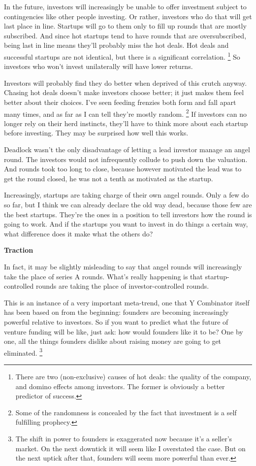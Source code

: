 \documentclass[12pt]{book}
\begin{document}
In the future, investors will increasingly be unable to offer investment
subject to contingencies like other people investing. Or rather,
investors who do that will get last place in line. Startups will go to
them only to fill up rounds that are mostly subscribed. And since hot
startups tend to have rounds that are oversubscribed, being last in line
means they'll probably miss the hot deals. Hot deals and successful
startups are not identical, but there is a significant correlation.
\footnote{There are two (non-exclusive) causes of hot deals: the quality
of the company, and domino effects among investors. The former is
obviously a better predictor of success.} So investors who won't invest unilaterally will
have lower returns.

Investors will probably find they do better when deprived of this crutch
anyway. Chasing hot deals doesn't make investors choose better; it just
makes them feel better about their choices. I've seen feeding frenzies
both form and fall apart many times, and as far as I can tell they're
mostly random. \footnote{Some of the randomness is concealed by the fact that investment
is a self fulfilling prophecy.} If investors can no longer rely
on their herd instincts, they'll have to think more about each startup
before investing. They may be surprised how well this works.

Deadlock wasn't the only disadvantage of letting a lead investor manage
an angel round. The investors would not infrequently collude to push
down the valuation. And rounds took too long to close, because however
motivated the lead was to get the round closed, he was not a tenth as
motivated as the startup.

Increasingly, startups are taking charge of their own angel rounds. Only
a few do so far, but I think we can already declare the old way dead,
because those few are the best startups. They're the ones in a position
to tell investors how the round is going to work. And if the startups
you want to invest in do things a certain way, what difference does it
make what the others do?

\textbf{Traction}

In fact, it may be slightly misleading to say that angel rounds will
increasingly take the place of series A rounds. What's really happening
is that startup-controlled rounds are taking the place of
investor-controlled rounds.

This is an instance of a very important meta-trend, one that Y
Combinator itself has been based on from the beginning: founders are
becoming increasingly powerful relative to investors. So if you want to
predict what the future of venture funding will be like, just ask: how
would founders like it to be? One by one, all the things founders
dislike about raising money are going to get eliminated.
\footnote{The shift in power to founders is exaggerated now because it's
a seller's market. On the next downtick it will seem like I overstated
the case. But on the next uptick after that, founders will seem more
powerful than ever.}
\end{document}
